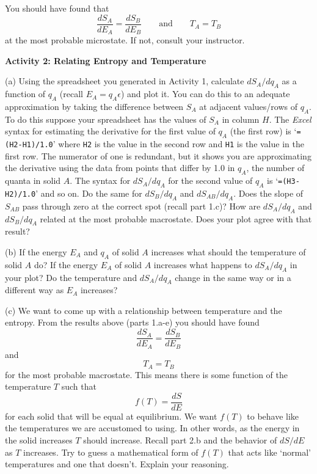 You should have found that 
\begin{equation}
\frac{dS_A}{dE_A} = \frac{dS_B}{dE_B} \qquad {\text {and}} \qquad T_A = T_B
\end{equation}
at the most probable microstate.
If not, consult your instructor.

\textbf{Activity 2: Relating Entropy and Temperature}

(a) Using the spreadsheet you generated in Activity 1, calculate $dS_A/dq_A$ as a function
of $q_A$ (recall $E_A = q_A \epsilon$) and plot it. You can do this to an adequate approximation
by  taking the difference between $S_A$ at adjacent values/rows
of $q_A$.
To do this suppose your spreadsheet has the values of $S_A$ in column $H$.
The {\it Excel} syntax for estimating the derivative for the first value of
$q_A$ (the first row) is 
`{\tt =(H2-H1)/1.0}' where {\tt H2} is the value in the second row and {\tt H1} is the
value in the first row.
The numerator of one is redundant, but it shows you are approximating the derivative
using the data from points that differ by 1.0 in $q_A$, the number of quanta in solid $A$.
The syntax for $dS_A/dq_A$ for the second value of $q_A$ is `{\tt =(H3-H2)/1.0}' and so on.
Do the same for $dS_B/dq_A$ and $dS_{AB}/dq_A$.
Does the slope of $S_{AB}$ pass through zero at the correct spot (recall part 1.c)?
How are $dS_A/dq_A$ and $dS_B/dq_A$ related at the most probable macrostate.
Does your plot agree with that result?
\vspace{15mm}

\newpage

(b) If the energy $E_A$ and $q_A$ of solid $A$ increases what should the temperature 
of solid $A$ do?
If the energy $E_A$ of solid $A$ increases what happens to $dS_A/dq_A$ in your plot?
Do the temperature and $dS_A/dq_A$ change in the same  way or in a different way 
as $E_A$ increases?
\vspace{15mm}

(c) We want to come up with a relationship between temperature and the entropy.
From the results above (parts 1.a-e) you should have found
\begin{equation}
\frac{dS_A}{dE_A} = \frac{dS_B}{dE_B}
\end{equation}
and
\begin{equation}
T_A = T_B
\end{equation}
for the most probable macrostate.
This means there is some function of the temperature $T$ such that
\begin{equation}\label{eq:fofT}
f(T) = \frac{dS}{dE}
\end{equation}
for each solid that will be equal at equilibrium.
We want $f(T)$ to behave like the temperatures we are accustomed to using.
In other words, as the energy in the solid increases $T$ should increase.
Recall part 2.b and the behavior of $dS/dE$ as $T$ increases.
Try to guess a mathematical form of $f(T)$ that acts like `normal' temperatures
and one that doesn't. Explain your reasoning.
\vspace{30mm}

